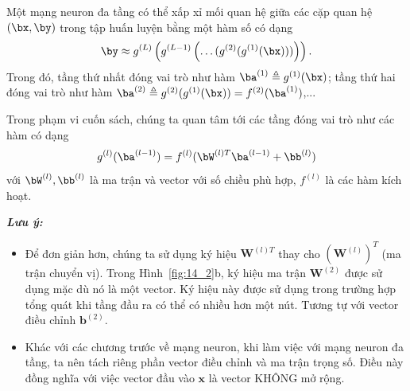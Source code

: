 
Một mạng neuron đa tầng có thể xấp xỉ mối quan hệ giữa
các cặp quan hệ $(\bx, \by)$ trong tập huấn luyện bằng một hàm số có dạng 
\begin{equation}
    \by \approx g^{(L)}\left(g^{(L-1)}\left(\dots
    (g^{(2)}(g^{(1)}(\bx)))\right)\right).
\end{equation}
Trong đó, tầng thứ nhất đóng vai trò như hàm $\ba^{(1)} \triangleq
g^{(1)}(\bx)$;
tầng thứ hai đóng vai trò như hàm $\ba^{(2)} \triangleq g^{(2)}(g^{(1)}(\bx)) =
f^{(2)}(\ba^{(1)})$,... 

Trong phạm vi cuốn sách, chúng ta quan tâm tới các tầng đóng vai trò như các
hàm có dạng
\begin{equation}
    g^{(l)}(\ba^{(l-1)}) = f^{(l)}(\bW^{(l)T}\ba^{(l-1)} + \bb^{(l)})
\end{equation}
với $\bW^{(l)}, \bb^{(l)}$ là ma trận và vector với số chiều phù hợp, $f^{(l)}$
là các hàm kích hoạt. 

\textbf{\textit{Lưu ý:}} \begin{itemize}

     
     
    \item Để đơn giản hơn, chúng ta sử dụng ký hiệu $\mathbf{W}^{(l)T}$ thay
    cho $(\mathbf{W}^{(l)})^T$ (ma trận chuyển vị). Trong Hình~\ref{fig:14_2}b,
    ký hiệu ma trận $\mathbf{W}^{(2)}$ được sử dụng mặc dù nó là một
    vector. Ký hiệu này được sử dụng trong trường hợp tổng quát khi tầng đầu ra có thể có nhiều hơn một nút. Tương tự với vector điều chỉnh $\mathbf{b}^{(2)}$.
 
    \item Khác với các chương trước về mạng neuron, khi làm việc với
    mạng neuron đa tầng, ta nên tách riêng phần vector điều chỉnh và ma trận trọng số. Điều này đồng nghĩa với việc vector đầu vào $\mathbf{x}$ là vector KHÔNG mở rộng.
\end{itemize}

